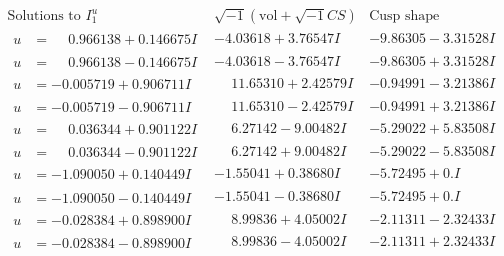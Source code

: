 \documentclass[1p]{elsarticle_modified}
\theoremstyle{definition}
\newcommand{\I}{\sqrt{-1}}
\begin{document}
$$\begin{array}{c|c|c}  
\text{Solutions to }I^u_{1}& \I (\text{vol} + \sqrt{-1}CS) & \text{Cusp shape}\\
 \hline 
\begin{aligned}
u &= \phantom{-}0.966138 + 0.146675 I\end{aligned}
 & -4.03618 + 3.76547 I & -9.86305 - 3.31528 I \\ \hline\begin{aligned}
u &= \phantom{-}0.966138 - 0.146675 I\end{aligned}
 & -4.03618 - 3.76547 I & -9.86305 + 3.31528 I \\ \hline\begin{aligned}
u &= -0.005719 + 0.906711 I\end{aligned}
 & \phantom{-}11.65310 + 2.42579 I & -0.94991 - 3.21386 I \\ \hline\begin{aligned}
u &= -0.005719 - 0.906711 I\end{aligned}
 & \phantom{-}11.65310 - 2.42579 I & -0.94991 + 3.21386 I \\ \hline\begin{aligned}
u &= \phantom{-}0.036344 + 0.901122 I\end{aligned}
 & \phantom{-}6.27142 - 9.00482 I & -5.29022 + 5.83508 I \\ \hline\begin{aligned}
u &= \phantom{-}0.036344 - 0.901122 I\end{aligned}
 & \phantom{-}6.27142 + 9.00482 I & -5.29022 - 5.83508 I \\ \hline\begin{aligned}
u &= -1.090050 + 0.140449 I\end{aligned}
 & -1.55041 + 0.38680 I & -5.72495 + 0. I\phantom{ +0.000000I} \\ \hline\begin{aligned}
u &= -1.090050 - 0.140449 I\end{aligned}
 & -1.55041 - 0.38680 I & -5.72495 + 0. I\phantom{ +0.000000I} \\ \hline\begin{aligned}
u &= -0.028384 + 0.898900 I\end{aligned}
 & \phantom{-}8.99836 + 4.05002 I & -2.11311 - 2.32433 I \\ \hline\begin{aligned}
u &= -0.028384 - 0.898900 I\end{aligned}
 & \phantom{-}8.99836 - 4.05002 I & -2.11311 + 2.32433 I \\ \hline\begin{aligned}

\end{aligned}
\end{array}$$
\end{document}
